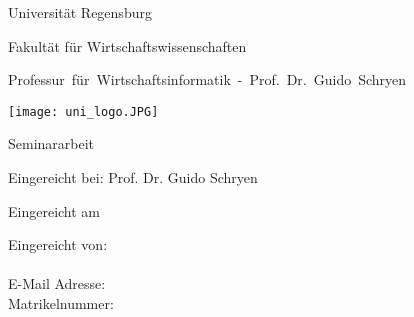 %
%
%

\thispagestyle{empty}
\begin{titlepage}


\begin{adjustwidth}{-2cm}{}


\renewcommand{\thepage}{}

\begin{center}

\large{Universität Regensburg\\}

\large{Fakultät für Wirtschaftswissenschaften\\}

\large{\mbox{Professur für Wirtschaftsinformatik - Prof. Dr. Guido Schryen}}

\vspace*{10mm}

\Large{\textbf{\titelthema}}

\vspace*{15mm}
\texttt{[image: uni\_logo.JPG]}
\vspace*{15mm}

\Large{Seminararbeit}

\vspace*{10mm}



\Large{Eingereicht bei: Prof. Dr. Guido Schryen\\}


\vspace*{5mm}

\large{Eingereicht am \abgabedatum\\}

\end{center}

\vfill

\begin{center}
\end{center}
\vspace*{6mm}
\begin{flushleft}
Eingereicht von:\\
\vspace*{7pt}
\authorname\\
E-Mail Adresse: \authormail\\
Matrikelnummer: \matrikelnr\\




\end{flushleft}

\end{adjustwidth}

\end{titlepage}

\newpage

